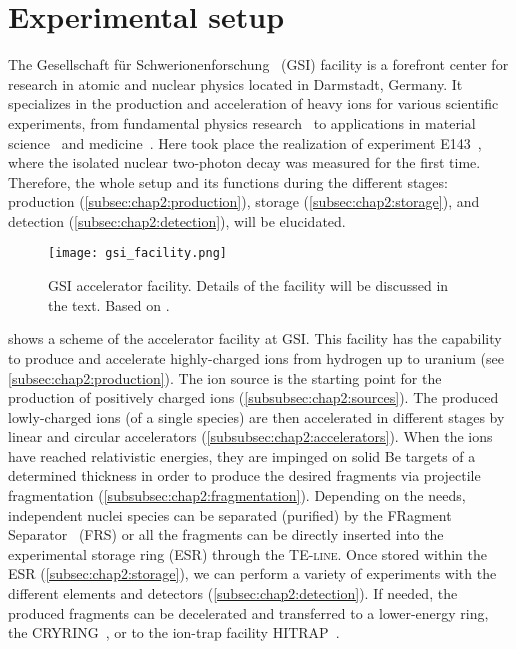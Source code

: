 \section{Experimental setup}\label{sec:chap2:experimentalsetup}
The Gesellschaft für Schwerionenforschung~\cite{GSI} (\textsc{GSI}) facility is a forefront center for research in atomic and nuclear physics located in Darmstadt, Germany. It specializes in the production and acceleration of heavy ions for various scientific experiments, from fundamental physics research~\cite{Loetzsch2024} to applications in material science~\cite{matscience} and medicine~\cite{kraft2013history}. Here took place the realization of experiment \textsc{E143}~\cite{kortenE143}, where the isolated nuclear two-photon decay was measured for the first time. Therefore, the whole setup and its functions during the different stages: production  (\cref{subsec:chap2:production}), storage (\cref{subsec:chap2:storage}), and detection (\cref{subsec:chap2:detection}), will be elucidated.
\begin{figure}[hbt]
    \texttt{[image: gsi\_facility.png]}
    \caption{\textsc{GSI} accelerator facility. Details of the facility will be discussed in the text. Based on \cite{GSIWebsite}.}
    \label{fig:chap2:gsi}
\end{figure}
\newpar
{} shows a scheme of the accelerator facility at \textsc{GSI}. This facility has the capability to produce and accelerate highly-charged ions from hydrogen up
to uranium (see \cref{subsec:chap2:production}). The ion source is the starting point for the production of positively charged ions (\cref{subsubsec:chap2:sources}). The produced lowly-charged ions (of a single species) are then accelerated in different stages by linear and circular accelerators (\cref{subsubsec:chap2:accelerators}). When the ions have reached relativistic energies, they are impinged on solid Be targets of a determined thickness in order to produce the desired fragments via projectile fragmentation (\cref{subsubsec:chap2:fragmentation}). Depending on the needs, independent nuclei species can be separated (purified) by the FRagment Separator~\cite{FRS} (\textsc{FRS}) or all the fragments can be directly inserted into the experimental storage ring (\textsc{ESR}) through the \textsc{TE-line}. Once stored within the \textsc{ESR} (\cref{subsec:chap2:storage}), we can perform a variety of experiments with the different elements and detectors (\cref{subsec:chap2:detection}). If needed, the produced fragments can be decelerated and transferred to a lower-energy ring, the \textsc{CRYRING}~\cite{cryring,cryringGSI}, or to the ion-trap facility \textsc{HITRAP}~\cite{hitrap}.

